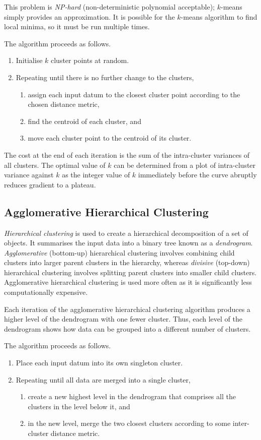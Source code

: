This problem is \emph{NP-hard} (non-deterministic polynomial acceptable); \( k \)-means simply provides an approximation.
It is possible for the \( k \)-means algorithm to find local minima, so it must be run multiple times.

The algorithm proceeds as follows.
\begin{enumerate}
  \item Initialise \( k \) cluster points at random.
  \item Repeating until there is no further change to the clusters,
  \begin{enumerate}
    \item assign each input datum to the closest cluster point according to the chosen distance metric,
    \item find the centroid of each cluster, and
    \item move each cluster point to the centroid of its cluster.
  \end{enumerate}
\end{enumerate}

The cost at the end of each iteration is the sum of the intra-cluster variances of all clusters.
The optimal value of \( k \) can be determined from a plot of intra-cluster variance against \( k \) as the integer value of \( k \) immediately before the curve abruptly reduces gradient to a plateau.

\subsection{Agglomerative Hierarchical Clustering}

\emph{Hierarchical clustering} is used to create a hierarchical decomposition of a set of objects.
It summarises the input data into a binary tree known as a \emph{dendrogram}.
\emph{Agglomerative} (bottom-up) hierarchical clustering involves combining child clusters into larger parent clusters in the hierarchy, whereas \emph{divisive} (top-down) hierarchical clustering involves splitting parent clusters into smaller child clusters.
Agglomerative hierarchical clustering is used more often as it is significantly less computationally expensive.

Each iteration of the agglomerative hierarchical clustering algorithm produces a higher level of the dendrogram with one fewer cluster.
Thus, each level of the dendrogram shows how data can be grouped into a different number of clusters.

The algorithm proceeds as follows.
\begin{enumerate}
  \item Place each input datum into its own singleton cluster.
  \item Repeating until all data are merged into a single cluster,
  \begin{enumerate}
    \item create a new highest level in the dendrogram that comprises all the clusters in the level below it, and
    \item in the new level, merge the two closest clusters according to some inter-cluster distance metric.
  \end{enumerate}
\end{enumerate}

